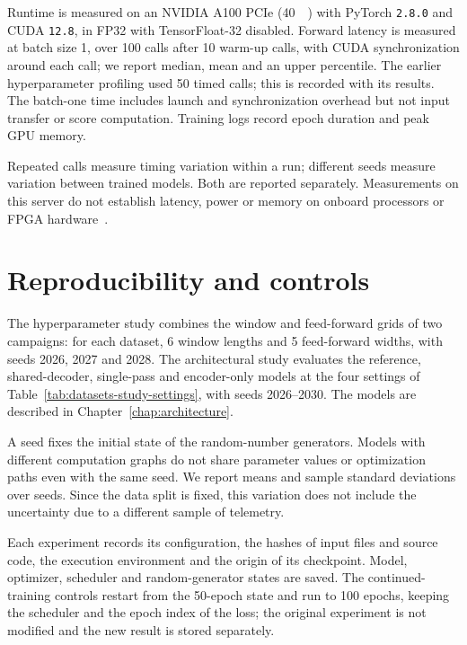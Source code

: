 Runtime is measured on an NVIDIA A100 PCIe (\SI{40}{\giga\byte}) with PyTorch
\texttt{2.8.0} and CUDA \texttt{12.8}, in FP32 with TensorFloat-32 disabled.
Forward latency is measured at batch size \num{1}, over \num{100} calls after
\num{10} warm-up calls, with CUDA synchronization around each call; we report
median, mean and an upper percentile. The earlier hyperparameter profiling
used \num{50} timed calls; this is recorded with its results. The batch-one
time includes launch and synchronization overhead but not input transfer or
score computation. Training logs record epoch duration and peak GPU memory.

Repeated calls measure timing variation within a run; different seeds
measure variation between trained models. Both are reported separately.
Measurements on this server do not establish latency, power or memory on
onboard processors or \ac{FPGA} hardware~\cite{Sze2017EfficientDNN}.

\section{Reproducibility and controls}
\label{sec:datasets-reproducibility}

The hyperparameter study combines the window and feed-forward grids of two
campaigns: for each dataset, \num{6} window lengths and \num{5} feed-forward
widths, with seeds \num{2026}, \num{2027} and \num{2028}. The architectural
study evaluates the reference, shared-decoder, single-pass and encoder-only
models at the four settings of Table~\ref{tab:datasets-study-settings}, with
seeds \num{2026}--\num{2030}. The models are described in
Chapter~\ref{chap:architecture}.

A seed fixes the initial state of the random-number generators. Models with
different computation graphs do not share parameter values or optimization
paths even with the same seed. We report means and sample standard
deviations over seeds. Since the data split is fixed, this variation does
not include the uncertainty due to a different sample of telemetry.

Each experiment records its configuration, the hashes of input files and
source code, the execution environment and the origin of its checkpoint.
Model, optimizer, scheduler and random-generator states are saved. The
continued-training controls restart from the \num{50}-epoch state and run to
\num{100} epochs, keeping the scheduler and the epoch index of the loss; the
original experiment is not modified and the new result is stored separately.


